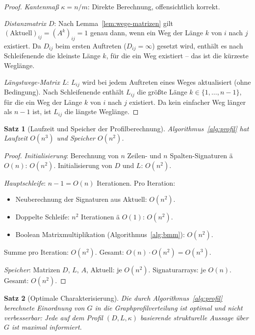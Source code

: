 ﻿\documentclass[a4paper,12pt,openany,oneside]{book}
\theoremstyle{definition}
\theoremstyle{plain}
\newtheorem{satz}{Satz}[chapter]
\theoremstyle{remark}
\begin{document}
\begin{proof}
  \emph{Kantenma\ss{}} $\kappa = n/m$: Direkte Berechnung, offensichtlich
  korrekt.

  \emph{Distanzmatrix $D$}: Nach Lemma~\ref{lem:wege-matrizen} gilt
  $(\mathrm{Aktuell})_{ij} = (A^k)_{ij} = 1$ genau dann, wenn ein Weg der
  L\"ange $k$ von $i$ nach $j$ existiert. Da $D_{ij}$ beim ersten Auftreten
  ($D_{ij} = \infty$) gesetzt wird, enth\"alt es nach Schleifenende die
  kleinste L\"ange $k$, f\"ur die ein Weg existiert -- das ist die k\"urzeste
  Wegl\"ange.

  \emph{L\"angstwege-Matrix $L$}: $L_{ij}$ wird bei jedem Auftreten
  eines Weges aktualisiert (ohne Bedingung). Nach Schleifenende enth\"alt
  $L_{ij}$ die gr\"o\ss{}te L\"ange $k \in \{1,\ldots,n-1\}$, f\"ur die ein Weg
  der L\"ange $k$ von $i$ nach $j$ existiert. Da kein einfacher Weg
  l\"anger als $n-1$ ist, ist $L_{ij}$ die l\"angste Wegl\"ange.
\end{proof}

\begin{satz}[Laufzeit und Speicher der Profilberechnung]
  Algorithmus~\ref{alg:profil} hat Laufzeit $O(n^3)$ und Speicher $O(n^2)$.
\end{satz}

\begin{proof}
  \emph{Initialisierung}: Berechnung von $n$ Zeilen- und $n$
  Spalten-Signaturen \"a $O(n)$: $O(n^2)$.
  Initialisierung von $D$ und $L$: $O(n^2)$.

  \emph{Hauptschleife}: $n-1 = O(n)$ Iterationen. Pro Iteration:
  \begin{itemize}
    \item Neuberechnung der Signaturen aus $\mathrm{Aktuell}$: $O(n^2)$.
    \item Doppelte Schleife: $n^2$ Iterationen \"a $O(1)$: $O(n^2)$.
    \item Boolean Matrixmultiplikation (Algorithmus~\ref{alg:bmm}): $O(n^2)$.
  \end{itemize}
  Summe pro Iteration: $O(n^2)$. Gesamt: $O(n) \cdot O(n^2) = O(n^3)$.

  \emph{Speicher}: Matrizen $D$, $L$, $A$, $\mathrm{Aktuell}$: je $O(n^2)$.
  Signaturarrays: je $O(n)$. Gesamt: $O(n^2)$.
\end{proof}

\begin{satz}[Optimale Charakterisierung]
  Die durch Algorithmus~\ref{alg:profil} berechnete Einordnung von $G$
  in die Graphprofilverteilung ist \emph{optimal und nicht verbesserbar}:
  Jede auf dem Profil $(D,L,\kappa)$ basierende strukturelle Aussage
  \"uber $G$ ist maximal informiert.
\end{satz}
\end{document}
